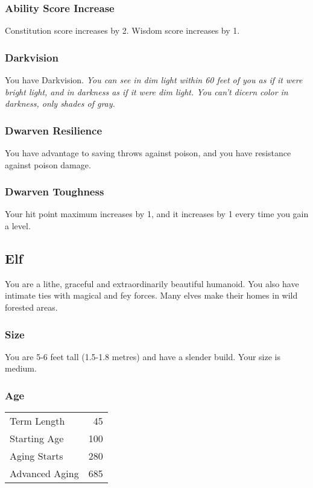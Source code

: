 \documentclass[10pt,twoside]{article}
\begin{document}
\begin{multicols}{2}
\subsubsection*{Ability Score Increase}
Constitution score increases by 2.
Wisdom score increases by 1.

\subsubsection*{Darkvision}
You have Darkvision.
\textit{You can see in dim light within 60 feet of you as if it were bright light, and in darkness as if it were dim light. You can’t dicern color in darkness, only shades of gray.}

\subsubsection*{Dwarven Resilience}
You have advantage to saving throws against poison, and you have resistance against poison damage.

\subsubsection*{Dwarven Toughness}
Your hit point maximum increases by 1, and it increases by 1 every time you gain a level.

\subsection{Elf}

You are a lithe, graceful and extraordinarily beautiful humanoid. You also have intimate ties with magical and fey forces. Many elves make their homes in wild forested areas.

\subsubsection*{Size}
You are 5-6 feet tall (1.5-1.8 metres) and have a slender build. Your size is medium.

\subsubsection*{Age}
\begin{tabular}{ l r }
  Term Length & 45 \\
  Starting Age & 100 \\
  Aging Starts & 280 \\
  Advanced Aging & 685 \\
\end{tabular}


\end{multicols}
\end{document}
